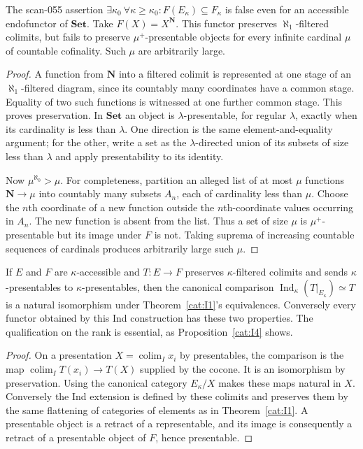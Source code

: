 \begin{proposition}\label{cat:I4}
The scan-055 assertion
$\exists\kappa_0\ \forall\kappa\geq\kappa_0:
F(E_\kappa)\subseteq F_\kappa$
is false even for an accessible endofunctor of $\mathbf{Set}$.
Take $F(X)=X^{\mathbf N}$.  This functor preserves
$\aleph_1$-filtered colimits, but fails to preserve
$\mu^+$-presentable objects for every infinite cardinal $\mu$ of
countable cofinality.  Such $\mu$ are arbitrarily large.
\end{proposition}
\begin{proof}
A function from $\mathbf N$ into a filtered colimit is represented at
one stage of an $\aleph_1$-filtered diagram, since its countably many
coordinates have a common stage.  Equality of two such functions is
witnessed at one further common stage.  This proves preservation.
In $\mathbf{Set}$ an object is $\lambda$-presentable, for regular
$\lambda$, exactly when its cardinality is less than $\lambda$.
One direction is the same element-and-equality argument; for the other,
write a set as the $\lambda$-directed union of its subsets of size
less than $\lambda$ and apply presentability to its identity.

Now $\mu^{\aleph_0}>\mu$.  For completeness, partition an alleged
list of at most $\mu$ functions $\mathbf N\to\mu$ into countably
many subsets $A_n$, each of cardinality less than $\mu$.  Choose the
$n$th coordinate of a new function outside the $n$th-coordinate
values occurring in $A_n$.  The new function is absent from the list.
Thus a set of size $\mu$ is $\mu^+$-presentable but its image under
$F$ is not.  Taking suprema of increasing countable sequences of
cardinals produces arbitrarily large such $\mu$.
\end{proof}

\begin{proposition}\label{cat:I5}
If $E$ and $F$ are $\kappa$-accessible and
$T:E\to F$ preserves $\kappa$-filtered colimits and sends
$\kappa$-presentables to $\kappa$-presentables, then the canonical
comparison
$\operatorname{Ind}_\kappa(T|_{E_\kappa})\simeq T$
is a natural isomorphism under Theorem~\ref{cat:I1}'s equivalences.
Conversely every functor obtained by this Ind construction has these
two properties.  The qualification on the rank is essential, as
Proposition~\ref{cat:I4} shows.
\end{proposition}
\begin{proof}
On a presentation $X=\operatorname{colim}_I x_i$ by presentables,
the comparison is the map
$\operatorname{colim}_I T(x_i)\to T(X)$ supplied by the cocone.
It is an isomorphism by preservation.  Using the canonical category
$E_\kappa/X$ makes these maps natural in $X$.  Conversely the Ind
extension is defined by these colimits and preserves them by the
same flattening of categories of elements as in
Theorem~\ref{cat:I1}.  A presentable object is a retract of a
representable, and its image is consequently a retract of a
presentable object of $F$, hence presentable.
\end{proof}

